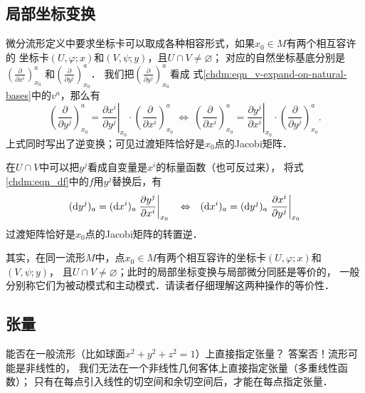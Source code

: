 \subsection{局部坐标变换}\label{chdm:sec_coortrans}
微分流形定义中要求坐标卡可以取成各种相容形式，如果$x_0\in M$有两个相互容许的
坐标卡$(U,\varphi;x)$和$(V,\psi;y)$，且$U\cap V \neq \varnothing$；
对应的自然坐标基底分别是$(\frac{\partial }{\partial x^i})^a_{x_0} $
和$(\frac{\partial }{\partial y^j})^a_{x_0} $．
我们把$(\frac{\partial }{\partial y^j})^a_{x_0} $看成
式\eqref{chdm:eqn_v-expand-on-natural-bases}中的$v^a$，那么有
\begin{equation}\label{chdm:eqn_xy-transform}
    \left(\frac{\partial }{\partial y^j}\right)^a_{x_0} = \left. \frac{\partial x^i}{\partial y^j}\right|_{x_0} \cdot
    \left(\frac{\partial }{\partial x^i}\right)^a_{x_0}     {\ \Leftrightarrow \ }
    \left(\frac{\partial }{\partial x^i}\right)^a_{x_0} = \left. \frac{\partial y^j}{\partial x^i}\right|_{x_0} \cdot
    \left(\frac{\partial }{\partial y^j}\right)^a_{x_0} .
\end{equation}
上式同时写出了逆变换；可见过渡矩阵恰好是$x_0$点的Jacobi矩阵．


在$U\cap V$中可以把$y^j$看成自变量是$x^i$的标量函数（也可反过来），
将式\eqref{chdm:eqn_df}中的$f$用$y^j$替换后，有
\begin{equation}\label{chdm:eqn_xy-cov-transform}
    ({\rm d}y^j)_a = ({\rm d}x^i)_a \left.\frac{\partial y^j}{\partial x^i}\right|_{x_0} 
    {\quad \Leftrightarrow \quad }
    ({\rm d}x^i)_a = ({\rm d}y^j)_a \left.\frac{\partial x^i}{\partial y^j}\right|_{x_0} 
\end{equation}
过渡矩阵恰好是$x_0$点的Jacobi矩阵的转置逆．

其实，在同一流形$M$中，点$x_0\in M$有两个相互容许的坐标卡$(U,\varphi;x)$和$(V,\psi;y)$，
且$U\cap V \neq \varnothing$；此时的局部坐标变换与局部微分同胚是等价的，
一般分别称它们为被动模式和主动模式．请读者仔细理解这两种操作的等价性．


\subsection{张量}\label{chdm:sec_tensor-p}


能否在一般流形（比如球面$x^2+y^2+z^2=1$）上直接指定张量？
答案否！流形可能是非线性的，
我们无法在一个非线性几何客体上直接指定张量（多重线性函数）；
只有在每点引入线性的切空间和余切空间后，才能在每点指定张量．


